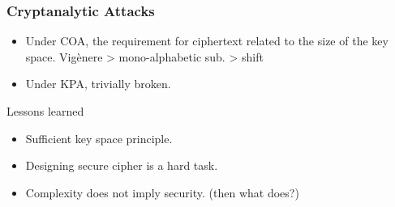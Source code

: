 \begin{frame}\frametitle{Cryptanalytic Attacks}
\begin{itemize}
\item Under COA, the requirement for ciphertext related to the size of the key space.  Vig\`{e}nere > mono-alphabetic sub. > shift
\item Under KPA, trivially broken.
\end{itemize}
\begin{alertblock}{Lessons learned}
\begin{itemize}
\item Sufficient key space principle.
\item Designing secure cipher is a hard task.
\item Complexity does not imply security. (then what does?)
\end{itemize}
\end{alertblock}
\end{frame}
